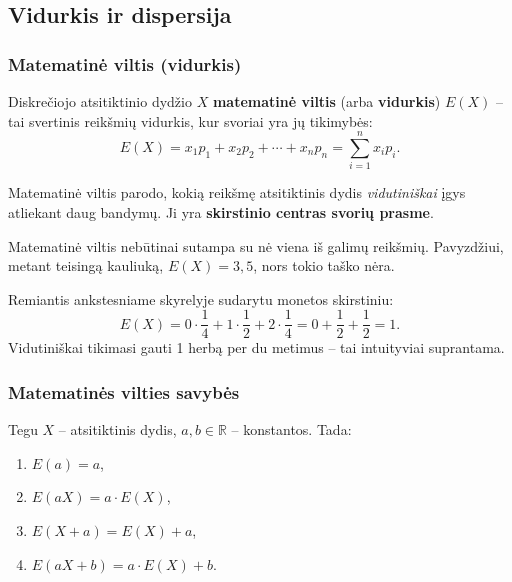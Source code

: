 \subsection{Vidurkis ir dispersija}

\subsubsection*{Matematinė viltis (vidurkis)}

\begin{definition}
Diskrečiojo atsitiktinio dydžio $X$ \textbf{matematinė viltis} (arba \textbf{vidurkis}) $E(X)$ – tai svertinis reikšmių vidurkis, kur svoriai yra jų tikimybės:
\[
E(X) = x_1 p_1 + x_2 p_2 + \cdots + x_n p_n = \sum_{i=1}^{n} x_i p_i.
\]
\end{definition}

Matematinė viltis parodo, kokią reikšmę atsitiktinis dydis \emph{vidutiniškai} įgys atliekant daug bandymų. Ji yra \textbf{skirstinio centras svorių prasme}.

\begin{remark}
Matematinė viltis nebūtinai sutampa su nė viena iš galimų reikšmių. Pavyzdžiui, metant teisingą kauliuką, $E(X) = 3{,}5$, nors tokio taško nėra.
\end{remark}

\begin{example}
Remiantis ankstesniame skyrelyje sudarytu monetos skirstiniu:
\[
E(X) = 0 \cdot \frac{1}{4} + 1 \cdot \frac{1}{2} + 2 \cdot \frac{1}{4} = 0 + \frac{1}{2} + \frac{1}{2} = 1.
\]
Vidutiniškai tikimasi gauti 1 herbą per du metimus – tai intuityviai suprantama.
\end{example}

\subsubsection*{Matematinės vilties savybės}

\begin{theorem}
Tegu $X$ – atsitiktinis dydis, $a, b \in \mathbb{R}$ – konstantos. Tada:
\begin{enumerate}
  \item $E(a) = a$,
  \item $E(aX) = a \cdot E(X)$,
  \item $E(X + a) = E(X) + a$,
  \item $E(aX + b) = a \cdot E(X) + b$.
\end{enumerate}
\end{theorem}

